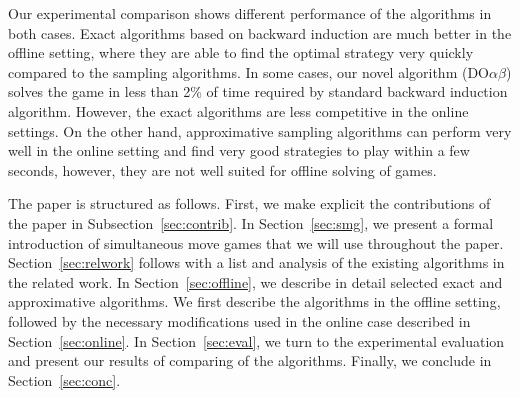 \documentclass[preprint,12pt]{elsarticle}
\newcommand{\reviewchange}[1]{{\color{blue}#1}}
\newcommand{\doab}[0]{\textrm{DO}\alpha\beta}
\begin{document}
Our experimental comparison shows different performance of the algorithms in both cases.
\reviewchange{Exact algorithms based on backward induction are much better in the offline setting, where they are able to find the optimal strategy very quickly compared to the sampling algorithms.}
In some cases, our novel algorithm ($\doab$) solves the game in less than 2\% of time required by standard backward induction algorithm.
However, the exact algorithms are less competitive in the online settings.
On the other hand, approximative sampling algorithms can perform very well in the online setting and
find very good strategies to play within a few seconds, however, they are not well suited for offline solving of games.

The paper is structured as follows. \reviewchange{First, we make explicit the contributions of the paper in Subsection~\ref{sec:contrib}.}
In Section~\ref{sec:smg}, we present a formal introduction of simultaneous move games that we will use throughout the paper.
Section~\ref{sec:relwork} follows with a list and analysis of the existing algorithms in the related work. In
Section~\ref{sec:offline}, we describe in detail selected exact and approximative algorithms.
We first describe the algorithms in the offline setting, followed by the necessary modifications used in the online
case described in Section~\ref{sec:online}.
In Section~\ref{sec:eval}, we turn to the experimental evaluation and present our results of comparing of the algorithms.
Finally, we conclude in Section~\ref{sec:conc}.
\end{document}
